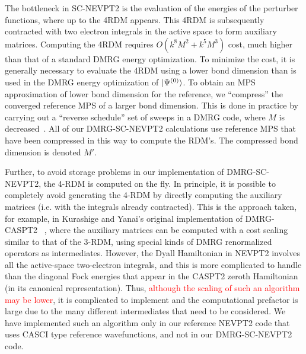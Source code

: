 The bottleneck in SC-NEVPT2 is the evaluation of the energies of the perturber functions, 
where up to the 4RDM appears. This 4RDM is subsequently contracted with 
two electron integrals in the active space to form auxiliary matrices.\cite{ angeli_n-electron_2002} 
Computing the 4RDM requires $O(k^8M^2+k^5M^3)$ cost, much higher than that of a standard DMRG energy optimization.
To minimize the cost, it is generally necessary to evaluate the 4RDM using a lower bond dimension than is used in the DMRG energy optimization of $\ket{\Psi^{(0)}}$.
To obtain an MPS approximation of lower bond dimension for the reference, 
we  ``compress'' the converged reference MPS of a larger bond dimension.
 This is done in practice by carrying out a ``reverse schedule'' set of sweeps
in a DMRG code, where $M$ is decreased~\cite{olivares-amaya_ab-initio_2015}. All of our DMRG-SC-NEVPT2 calculations use reference MPS that have been 
compressed in this way to compute the RDM's. The compressed bond dimension is
denoted $M'$.

Further, to avoid storage problems in our implementation of DMRG-SC-NEVPT2, 
the 4-RDM is computed on the fly. In principle, it is possible to 
completely avoid generating the 4-RDM by directly computing the auxiliary matrices (i.e. with the integrals already contracted). 
This is the approach taken, for example, in Kurashige and Yanai's original implementation of DMRG-CASPT2
~\cite{kurashige_second-order_2011}, where the auxiliary matrices can be computed with a cost scaling similar to that of the 3-RDM,
using special kinds of DMRG renormalized operators as intermediates. However, the Dyall Hamiltonian in NEVPT2 
involves all the active-space two-electron integrals, and this is more complicated to handle than the diagonal Fock energies that appear in the CASPT2 zeroth 
Hamiltonian (in its canonical representation). Thus, \textcolor{red}{although the scaling of such an algorithm may be lower}, it is complicated to implement
and the computational prefactor is large due to the many different intermediates that need to be considered. We have implemented
such an algorithm only in our reference NEVPT2 code that uses CASCI type reference wavefunctions, and not in our DMRG-SC-NEVPT2 code.





